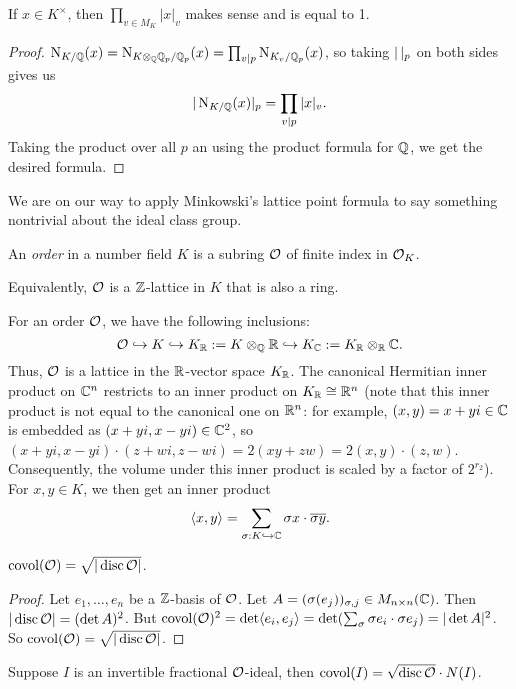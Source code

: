 \documentclass[11pt]{amsart}
\begin{document}
\begin{thm}
If $x\in K^{\times}$, then $\prod_{v\in M_K} |x|_v$ makes sense and is equal to 1.
\end{thm}

\begin{proof}
$\operatorname{N}_{K/\mathbb{Q}}(x) = \operatorname{N}_{K\otimes_{\mathbb{Q}} \mathbb{Q}_p/\mathbb{Q}_p}(x) = \prod_{v\mid p} \operatorname{N}_{K_v/\mathbb{Q}_p}(x)$, so taking $|\thinspace|_p$ on both sides gives us
\[|\operatorname{N}_{K/\mathbb{Q}}(x)|_p = \prod_{v\mid p} |x|_v.\]
Taking the product over all $p$ an using the product formula for $\mathbb{Q}$, we get the desired formula.
\end{proof}

We are on our way to apply Minkowski's lattice point formula to say something nontrivial about the ideal class group. 


\begin{defn}
An \emph{order} in a number field $K$ is a subring $\mathcal{O}$ of finite index in $\mathcal{O}_K$.
\end{defn}

Equivalently, $\mathcal{O}$ is a $\mathbb{Z}$-lattice in $K$ that is also a ring.

For an order $\mathcal{O}$, we have the following inclusions: 
\[\mathcal{O} \hookrightarrow K \hookrightarrow K_{\mathbb{R}} := K\otimes_{\mathbb{Q}}\mathbb{R} \hookrightarrow K_{\mathbb{C}}:= K_{\mathbb{R}}\otimes_{\mathbb{R}} \mathbb{C}.\]
Thus, $\mathcal{O}$ is a lattice in the $\mathbb{R}$-vector space $K_{\mathbb{R}}$. The canonical Hermitian inner product on $\mathbb{C}^n$ restricts to an inner product on $K_{\mathbb{R}}\cong \mathbb{R}^n$ (note that this inner product is not equal to the canonical one on $\mathbb{R}^n$: for example, $(x,y) = x+yi\in \mathbb{C}$ is embedded as $(x+yi, x-yi)\in \mathbb{C}^2$, so $(x+yi, x-yi)\cdot (z+wi, z-wi) = 2(xy+zw) = 2(x,y)\cdot (z,w)$. Consequently, the volume under this inner product is scaled by a factor of $2^{r_2}$). For $x,y\in K$, we then get an inner product
\[\langle x, y \rangle = \sum_{\sigma: K\hookrightarrow \mathbb{C}} \sigma x \cdot \overline{\sigma y}.\]

\begin{prop}
$\operatorname{covol}(\mathcal{O}) = \sqrt{|\operatorname{disc} \mathcal{O}|}$.
\end{prop}

\begin{proof}
Let $e_1,\dots,e_n$ be a $\mathbb{Z}$-basis of $\mathcal{O}$. Let $A = (\sigma(e_j))_{\sigma,j}\in M_{n\times n}(\mathbb{C})$. Then $|\operatorname{disc} \mathcal{O}| = (\det A)^2$. But $\operatorname{covol}(\mathcal{O})^2 = \det \langle e_i, e_j\rangle = \det(\sum_{\sigma} \sigma e_i \cdot \sigma e_j) = |\det A|^2$. So $\operatorname{covol}(\mathcal{O}) = \sqrt{|\operatorname{disc} \mathcal{O}|}$.
\end{proof}

\begin{cor}
Suppose $I$ is an invertible fractional $\mathcal{O}$-ideal, then $\operatorname{covol}(I) = \sqrt{\operatorname{disc} \mathcal{O}}\cdot N(I)$.
\end{cor}
\end{document}
